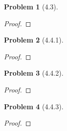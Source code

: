 \documentclass[10pt]{article}
\newcommand{\sk}{\vskip 10mm}
\theoremstyle{plain}
\newtheorem{problem}{Problem}
\theoremstyle{remark}
\begin{document}
\sk

\begin{problem}[4.3]
  
\end{problem}

\begin{proof}
  
\end{proof}

\sk

\begin{problem}[4.4.1]
  
\end{problem}

\begin{proof}
  
\end{proof}

\sk

\begin{problem}[4.4.2]
  
\end{problem}

\begin{proof}
  
\end{proof}

\sk

\begin{problem}[4.4.3]
  
\end{problem}

\begin{proof}
  
\end{proof}

\sk

\end{document}
